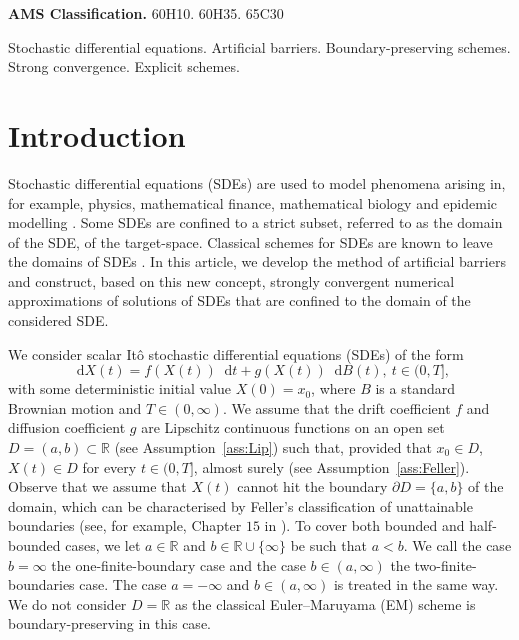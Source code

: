 \documentclass[11pt]{amsart}
\newcommand*\diff{\mathop{}\!\mathrm{d}}
\begin{document}
\maketitle
{\small\noindent
{\bf AMS Classification.} 60H10. 60H35. 65C30

\bigskip{} Stochastic differential equations. Artificial barriers. Boundary-preserving schemes. Strong convergence. Explicit schemes.

\vspace{1cm}

\section{Introduction}\label{sec:intro}
Stochastic differential equations (SDEs) are used to model phenomena arising in, for example, physics, mathematical finance, mathematical biology and epidemic modelling \cite{GraySIS,Karlin1981ASC,introTostocCalc,MR1214374,MR2001996}. Some SDEs are confined to a strict subset, referred to as the domain of the SDE, of the target-space. Classical schemes for SDEs are known to leave the domains of SDEs \cite{MR4737060}. In this article, we develop the method of artificial barriers and construct, based on this new concept, strongly convergent numerical approximations of solutions of SDEs that are confined to the domain of the considered SDE.

We consider scalar Itô stochastic differential equations (SDEs) of the form
\begin{equation}\label{eq:SDE}
\diff X(t) = f(X(t)) \diff t + g(X(t)) \diff B(t),\ t \in (0,T],
\end{equation}
with some deterministic initial value $X(0) = x_{0}$, where $B$ is a standard Brownian motion and $T \in (0,\infty)$. We assume that the drift coefficient $f$ and diffusion coefficient $g$ are Lipschitz continuous functions on an open set $D = (a,b) \subset \mathbb{R}$ (see Assumption~\ref{ass:Lip}) such that, provided that $x_{0} \in D$, $X(t) \in D$ for every $t \in (0,T]$, almost surely (see Assumption~\ref{ass:Feller}). Observe that we assume that $X(t)$ cannot hit the boundary $\partial D = \{a,b \}$ of the domain, which can be characterised by Feller's classification of unattainable boundaries (see, for example, Chapter $15$ in \cite{Karlin1981ASC}). To cover both bounded and half-bounded cases, we let $a \in \mathbb{R}$ and $b \in \mathbb{R} \cup \{ \infty \}$ be such that $a < b$. We call the case $b = \infty$ the one-finite-boundary case and the case $b \in (a,\infty)$ the two-finite-boundaries case. The case $a = -\infty$ and $b \in (a,\infty)$ is treated in the same way. We do not consider $D = \mathbb{R}$ as the classical Euler–Maruyama (EM) scheme is boundary-preserving in this case. 

}
\end{document}

